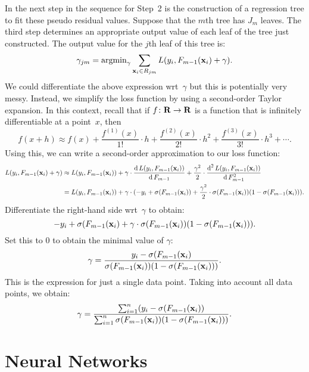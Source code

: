 In the next step in the sequence for Step~2 is the construction of a regression 
tree to fit these pseudo residual values. Suppose that the $m$th tree has $J_m$
leaves. The third step determines an appropriate output value of each leaf of 
the tree just constructed. The output value for the $j$th leaf of this tree 
is:
\[
    \gamma_{j m} = \operatorname{argmin}_{\gamma} 
                            \sum_{\mathbf{x}_i \in R_{j m}} L(y_i, F_{m - 1}(\mathbf{x}_i) + \gamma).
\] 
We could differentiate the above expression wrt~$\gamma$ but this is potentially very messy. 
Instead, we simplify the loss function by using a second-order Taylor expansion. 
In this context, recall that if $f \colon \mathbf{R} \to \mathbf{R}$ is a function that is infinitely
differentiable at a point~$x$, then
\[
    f(x + h) \approx f(x) 
                        + \frac{f^{(1)}(x)}{1!} \cdot h 
                        + \frac{f^{(2)}(x)}{2!} \cdot h^{2} 
                        + \frac{f^{(3)}(x)}{3!} \cdot h^{3}
                        + \cdots.
\]
Using this, we can write a second-order approximation to our loss function:
\begin{align*}
    L(y_i, F_{m - 1}(\mathbf{x}_i) + \gamma) 
            & \approx L(y_i, F_{m - 1}(\mathbf{x}_i)) 
            + \gamma \cdot \frac{\operatorname{d} L(y_i, F_{m - 1}(\mathbf{x}_i))}{\operatorname{d} F_{m-1}} 
            + \frac{\gamma^2}{2} \cdot \frac{\operatorname{d}^2 L(y_i, F_{m - 1}(\mathbf{x}_i))}{\operatorname{d} F_{m-1}^2} \\
            & = L(y_i, F_{m - 1}(\mathbf{x}_i)) 
            + \gamma \cdot (-y_i + \sigma(F_{m - 1}(\mathbf{x}_i)) 
            + \frac{\gamma^2}{2} \cdot \sigma(F_{m - 1}(\mathbf{x}_i)) (1 - \sigma(F_{m - 1}(\mathbf{x}_i))).
\end{align*}
Differentiate the right-hand side wrt~$\gamma$ to obtain:
\[
    -y_i + \sigma(F_{m - 1}(\mathbf{x}_i) + \gamma \cdot \sigma(F_{m - 1}(\mathbf{x}_i)) (1 - \sigma(F_{m - 1}(\mathbf{x}_i))).
\]
Set this to $0$ to obtain the minimal value of $\gamma$:
\[
    \gamma = \frac{y_i - \sigma(F_{m - 1}(\mathbf{x}_i)}{\sigma(F_{m - 1}(\mathbf{x}_i)) (1 - \sigma(F_{m - 1}(\mathbf{x}_i)))}.
\]
This is the expression for just a single data point. Taking into account all data points, 
we obtain:
\[
    \gamma = \frac{\sum_{i = 1}^{n} (y_i - \sigma(F_{m - 1}(\mathbf{x}_i))}{\sum_{i = 1}^{n}\sigma(F_{m - 1}(\mathbf{x}_i)) (1 - \sigma(F_{m - 1}(\mathbf{x}_i)))}.
\]

\chapter{Neural Networks}

